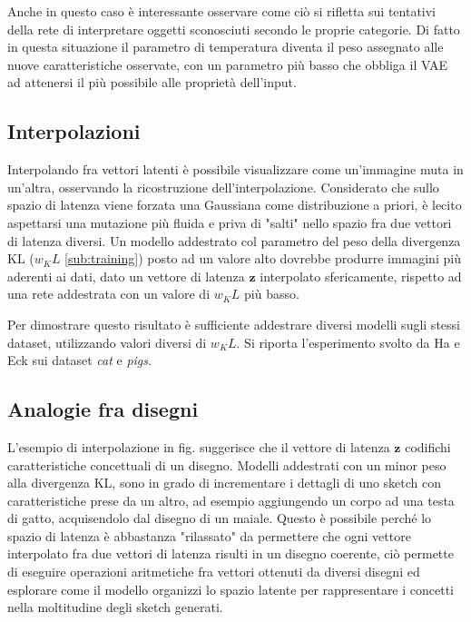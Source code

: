 Anche in questo caso è interessante osservare come ciò si rifletta sui tentativi della rete di interpretare oggetti sconosciuti secondo le proprie categorie. Di fatto in questa situazione il parametro di temperatura diventa il peso assegnato alle nuove caratteristiche osservate, con un parametro più basso che obbliga il VAE ad attenersi il più possibile alle proprietà dell'input.
\subsection{Interpolazioni} %
\label{sub:interpolazioni}
Interpolando fra vettori latenti è possibile visualizzare come un'immagine muta in un'altra, osservando la ricostruzione dell'interpolazione. Considerato che sullo spazio di latenza viene forzata una Gaussiana come distribuzione a priori, è lecito aspettarsi una mutazione più fluida e priva di "salti" nello spazio fra due vettori di latenza diversi. Un modello addestrato col parametro del peso della divergenza KL ($w_KL$ \ref{sub:training}) posto ad un valore alto dovrebbe produrre immagini più aderenti ai dati, dato un vettore di latenza $\boldsymbol{z}$ interpolato sfericamente, rispetto ad una rete addestrata con un valore di $w_KL$ più basso.

Per dimostrare questo risultato è sufficiente addestrare diversi modelli sugli stessi dataset, utilizzando valori diversi di $w_KL$. Si riporta l'esperimento svolto da Ha e Eck sui dataset \textit{cat} e \textit{pigs}.
\subsection{Analogie fra disegni} %
\label{sub:analogie_fra_disegni}
L'esempio di interpolazione in fig. suggerisce che il vettore di latenza $\boldsymbol{z}$ codifichi caratteristiche concettuali di un disegno. Modelli addestrati con un minor peso alla divergenza KL, sono in grado di incrementare i dettagli di uno sketch con caratteristiche prese da un altro, ad esempio aggiungendo un corpo ad una testa di gatto, acquisendolo dal disegno di un maiale. Questo è possibile perché lo spazio di latenza è abbastanza "rilassato" da permettere che ogni vettore interpolato fra due vettori di latenza risulti in un disegno coerente, ciò permette di eseguire operazioni aritmetiche fra vettori ottenuti da diversi disegni ed esplorare come il modello organizzi lo spazio latente per rappresentare i concetti nella moltitudine degli sketch generati.

